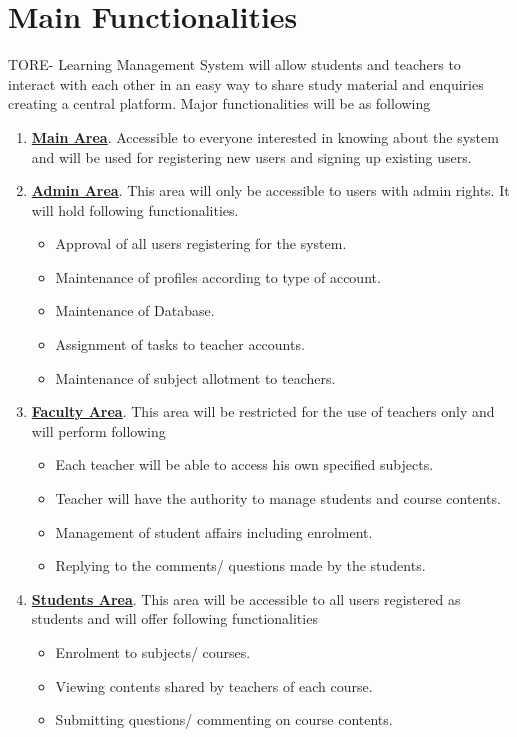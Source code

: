 \section{Main Functionalities}
TORE- Learning Management System will allow students and teachers to interact with each other in an easy way to share study material and enquiries creating a central platform. Major functionalities will be as following
\begin{enumerate}

    \item \textbf{\underline {Main Area}}. Accessible to everyone interested in knowing about the system and will be used for registering new users and signing up existing users.
    \item \textbf{\underline {Admin Area}}. This area will only be accessible to users with admin rights. It will hold following functionalities.
    \begin{itemize}
        \item Approval of all users registering for the system.
        \item Maintenance of profiles according to type of account.
        \item Maintenance of Database.
        \item Assignment of tasks to teacher accounts.
        \item Maintenance of subject allotment to teachers.
    \end{itemize}
    \item \textbf{\underline {Faculty Area}}. This area will be restricted for the use of teachers only and will perform following
     \begin{itemize}
        \item Each teacher will be able to access his own specified subjects.
        \item Teacher will have the authority to manage students and course contents.
        \item Management of student affairs including enrolment.
        \item Replying to the comments/ questions made by the students.
    \end{itemize}
    \item \textbf{\underline {Students Area}}. This area will be accessible to all users registered as students and will offer following functionalities
    \begin{itemize}
        \item Enrolment to subjects/ courses.
        \item Viewing contents shared by teachers of each course.
        \item Submitting questions/ commenting on course contents.
    \end{itemize}
\end{enumerate}
